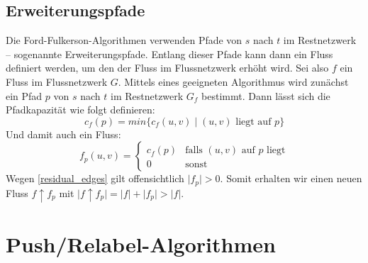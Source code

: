 \documentclass[12pt,a4paper,titlepage,onecolumn,ngerman]{scrartcl}
\theoremstyle{definition}
\theoremstyle{remark}
\newcommand{\ff}{Ford-Fulkerson}
\newcommand{\pr}{Push/Relabel}
\begin{document}
\subsection{Erweiterungspfade}
Die \ff -Algorithmen verwenden Pfade von $s$ nach $t$ im Restnetzwerk -- sogenannte Erweiterungspfade.
Entlang dieser Pfade kann dann ein Fluss definiert werden, um den der Fluss im Flussnetzwerk erhöht wird.
\medbreak
Sei also $f$ ein Fluss im Flussnetzwerk $G$.
Mittels eines geeigneten Algorithmus wird zunächst ein Pfad $p$ von $s$ nach $t$ im Restnetzwerk $G_f$ bestimmt.
Dann lässt sich die Pfadkapazität wie folgt definieren:
\begin{equation}
    c_f(p) = min\{ c_f(u,v)\mid (u,v) \text{ liegt auf $p$}\}
\end{equation}
\medbreak
Und damit auch ein Fluss:
\begin{equation}
    f_p(u,v) = \begin{cases}c_f(p) & \text{falls $(u,v)$ auf $p$ liegt}\\0 & \text{sonst}\end{cases}
\end{equation}
\medbreak
Wegen \eqref{residual_edges} gilt offensichtlich $\lvert f_p\rvert > 0$.
Somit erhalten wir einen neuen Fluss $f\uparrow f_p$ mit $\lvert f\uparrow f_p \rvert = \lvert f \rvert + \lvert f_p\rvert > \lvert f\rvert$. %
\section{\pr -Algorithmen}

\newpage
\printbibliography
\end{document}
